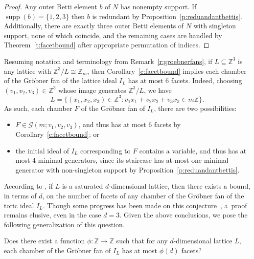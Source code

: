 \documentclass[ALCO, Unicode]{cedram}
\newcommand\ZZ{\mathbb{Z}}
\DeclareMathOperator\supp{supp}
\begin{document}
\begin{proof}
Any outer Betti element $b$ of $N$ has nonempty support.  If $\supp(b) = \{1,2,3\}$ then $b$ is redundant by Proposition~\ref{p:reduandantbettis}.  Additionally, there are exactly three outer Betti elements of $N$ with singleton support, none of which coincide, and the remaining cases are handled by Theorem~\ref{t:facetbound} after appropriate permutation of indices.  
\end{proof}

\begin{remas}\label{r:latticefacetbound}
Resuming notation and terminology from Remark~\ref{r:groebnerfans}, if $L \subseteq \ZZ^3$ is any lattice with $\ZZ^3/L \cong \ZZ_m$, then Corollary~\ref{c:facetbound} implies each chamber of the Gr\"obner fan of the lattice ideal $I_L$ has at most 6 facets.  
Indeed, choosing $(v_1, v_2, v_3) \in \ZZ^3$ whose image generates $\ZZ^3/L$, we have
$$L = \{(x_1, x_2, x_3) \in \ZZ^3 : v_1x_1 + v_2x_2 + v_3x_3 \in m\ZZ\}.$$
As such, each chamber $F$ of the Gr\"obner fan of $I_L$, there are two possibilities:
\begin{itemize}
\item 
$F \in \mathcal G(m; v_1,v_2,v_3)$, and thus has at most 6 facets by Corollary~\ref{c:facetbound}; or

\item 
the initial ideal of $I_L$ corresponding to $F$ contains a variable, and thus has at most 4 minimal generators, since its staircase has at most one minimal generator with non-singleton support by Proposition~\ref{p:reduandantbettis}.  

\end{itemize}
According to \cite[Conjecture~6.1]{groenberfanchamberfacets}, if $L$ is a saturated $d$-dimensional lattice, then there exists a bound, in terms of $d$, on the number of facets of any chamber of the Gr\"obner fan of the toric ideal $I_L$.  Though some progress has been made on this conjecture~\cite{supernormalconfigs}, a~proof remains elusive, even in the case $d = 3$.  Given the above conclusions, we pose the following generalization of this question.  
\end{remas}

\begin{question}\label{q:latticefacetbound}
Does there exist a function $\phi:\ZZ \to \ZZ$ such that for any $d$-dimensional lattice $L$, each chamber of the Gr\"obner fan of $I_L$ has at most $\phi(d)$ facets?  
\end{question}
\end{document}
